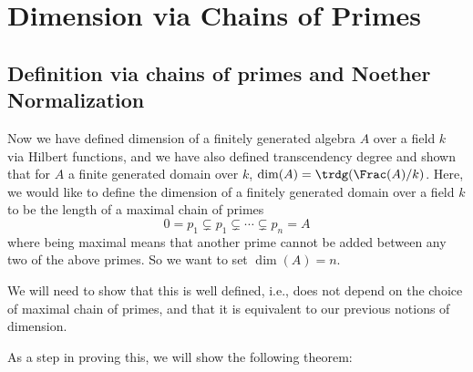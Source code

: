 \documentclass[12 pt]{article}
\theoremstyle{definition}
\renewcommand{\(}{\left(}
\renewcommand{\)}{\right)}
\begin{document}
\newpage




\section{Dimension via Chains of Primes}


\subsection{Definition via chains of primes and Noether Normalization}

Now we have defined dimension of a finitely generated algebra $A$ over a field $k$ via Hilbert functions, and we have also defined transcendency degree and shown that for $A$ a finite generated domain over $k$, $\dim(A)=\trdg(\Frac(A)/k)$. Here, we would like to define the dimension of a finitely generated domain over a field $k$ to be the length of a maximal chain of primes
\[0 =p_1 \subsetneq p_1 \subsetneq \cdots \subsetneq p_n=A\]
where being maximal means that another prime cannot be added between any two of the above primes. So we want to set $\dim(A)=n$.

We will need to show that this is well defined, i.e., does not depend on the choice of maximal chain of primes, and that it is equivalent to our previous notions of dimension.

As a step in proving this, we will show the following theorem:
\end{document}
